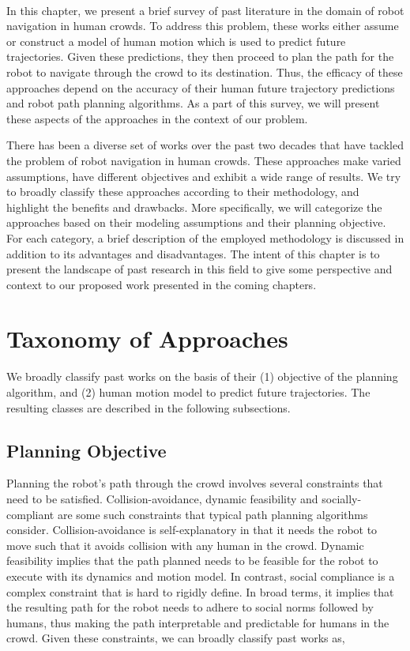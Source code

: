  \\
In this chapter, we present a brief survey of past literature in the domain of robot navigation in human crowds. To address this problem, these works either assume or construct a model of human motion which is used to predict future trajectories. Given these predictions, they then proceed to plan the path for the robot to navigate through the crowd to its destination. Thus, the efficacy of these approaches depend on the accuracy of their human future trajectory predictions and robot path planning algorithms. As a part of this survey, we will present these aspects of the approaches in the context of our problem.

There has been a diverse set of works over the past two decades that have tackled the problem of robot navigation in human crowds. These approaches make varied assumptions, have different objectives and exhibit a wide range of results. We try to broadly classify these approaches according to their methodology, and highlight the benefits and drawbacks. More specifically, we will categorize the approaches based on their modeling assumptions and their planning objective. For each category, a brief description of the employed methodology is discussed in addition to its advantages and disadvantages. The intent of this chapter is to present the landscape of past research in this field to give some perspective and context to our proposed work presented in the coming chapters.

\section{Taxonomy of Approaches}
\label{sec:taxonomy-approaches}

We broadly classify past works on the basis of their (1) objective of the planning algorithm, and (2) human motion model to predict future trajectories. The resulting classes are described in the following subsections.

\subsection{Planning Objective}
\label{sec:planning-objective}
Planning the robot's path through the crowd involves several constraints that need to be satisfied. Collision-avoidance, dynamic feasibility and socially-compliant are some such constraints that typical path planning algorithms consider. Collision-avoidance is self-explanatory in that it needs the robot to move such that it avoids collision with any human in the crowd. Dynamic feasibility implies that the path planned needs to be feasible for the robot to execute with its dynamics and motion model. In contrast, social compliance is a complex constraint that is hard to rigidly define. In broad terms, it implies that the resulting path for the robot needs to adhere to social norms followed by humans, thus making the path interpretable and predictable for humans in the crowd. Given these constraints, we can broadly classify past works as,

